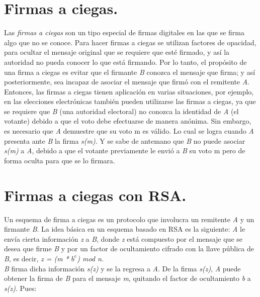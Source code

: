 \section{Firmas a ciegas. }

Las \textit{firmas a ciegas} son un tipo especial de firmas digitales en las que se firma algo que no se conoce. Para hacer firmas a ciegas se utilizan factores de opacidad, para ocultar el mensaje original que se requiere que esté firmado, y así la autoridad no pueda conocer lo que está firmando.
Por lo tanto, el propósito de una firma a ciegas es evitar que el firmante \textit{B} conozca el mensaje que firma; y así posteriormente, sea incapaz de asociar el mensaje que firmó con el remitente \textit{A}. Entonces, las firmas a ciegas tienen aplicación en varias situaciones, por ejemplo, en las elecciones electrónicas también pueden utilizarse las firmas a ciegas, ya que se requiere que \textit{B} (una autoridad electoral) no conozca la identidad de \textit{A} (el votante) debido a que el voto debe efectuarse de manera anónima. Sin embargo, es necesario que \textit{A} demuestre que su voto m es válido. Lo cual se logra cuando \textit{A} presenta ante \textit{B} la firma \textit{s(m)}. Y se sabe de antemano que \textit{B} no puede asociar \textit{s(m)} a \textit{A}, debido a que el votante previamente le envió a \textit{B} su voto m pero de forma oculta para que se lo firmara. ~\cite{ciegas}



\section{Firmas a ciegas con RSA. }

Un esquema de firma a ciegas es un protocolo que involucra un remitente \textit{A} y un firmante \textit{B}. La idea básica en un esquema basado en RSA es la siguiente: \textit{A} le envía cierta información \textit{z} a \textit{B}, donde \textit{z} está compuesto por el mensaje que se desea que firme \textit{B} y por un factor de ocultamiento cifrado con la llave pública de \textit{B}, es decir, \textit{z = (m *  $b^{e}$) mod n}.  \\
\textit{B} firma dicha información \textit{s(z)} y se la regresa a \textit{A}. De la firma \textit{s(z)}, \textit{A} puede obtener la firma de \textit{B} para el mensaje \textit{m}, quitando el factor de ocultamiento \textit{b} a \textit{s(z)}. Pues: \\

